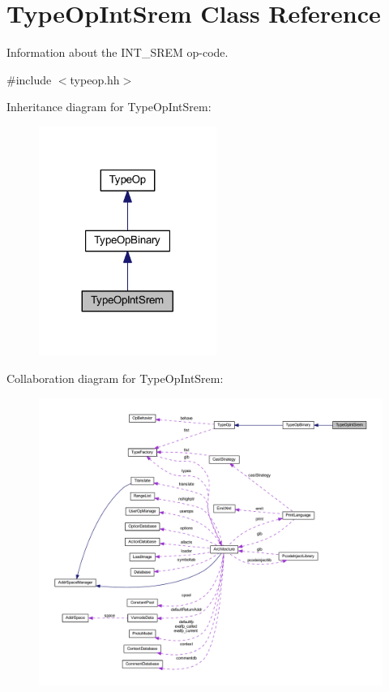 \hypertarget{class_type_op_int_srem}{}\section{Type\+Op\+Int\+Srem Class Reference}
\label{class_type_op_int_srem}


Information about the I\+N\+T\+\_\+\+S\+R\+EM op-\/code.  




{\ttfamily \#include $<$typeop.\+hh$>$}



Inheritance diagram for Type\+Op\+Int\+Srem\+:
\nopagebreak
\begin{figure}[H]
\begin{center}
\leavevmode
\includegraphics[width=164pt]{class_type_op_int_srem__inherit__graph}
\end{center}
\end{figure}


Collaboration diagram for Type\+Op\+Int\+Srem\+:
\nopagebreak
\begin{figure}[H]
\begin{center}
\leavevmode
\includegraphics[width=350pt]{class_type_op_int_srem__coll__graph}
\end{center}
\end{figure}
